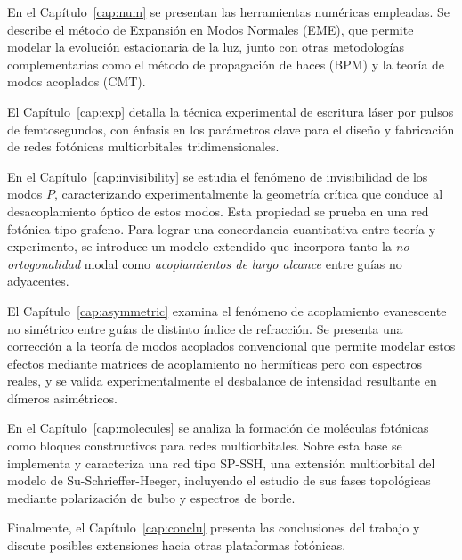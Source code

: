 En el Capítulo~\ref{cap:num} se presentan las herramientas numéricas empleadas. Se describe el método de Expansión en Modos Normales (EME), que permite modelar la evolución estacionaria de la luz, junto con otras metodologías complementarias como el método de propagación de haces (BPM) y la teoría de modos acoplados (CMT).

El Capítulo~\ref{cap:exp} detalla la técnica experimental de escritura láser por pulsos de femtosegundos, con énfasis en los parámetros clave para el diseño y fabricación de redes fotónicas multiorbitales tridimensionales.

En el Capítulo~\ref{cap:invisibility} se estudia el fenómeno de invisibilidad de los modos \( P \), caracterizando experimentalmente la geometría crítica que conduce al desacoplamiento óptico de estos modos. Esta propiedad se prueba en una red fotónica tipo grafeno. Para lograr una concordancia cuantitativa entre teoría y experimento, se introduce un modelo extendido que incorpora tanto la \textit{no ortogonalidad} modal como \textit{acoplamientos de largo alcance} entre guías no adyacentes.

El Capítulo~\ref{cap:asymmetric} examina el fenómeno de acoplamiento evanescente no simétrico entre guías de distinto índice de refracción. Se presenta una corrección a la teoría de modos acoplados convencional que permite modelar estos efectos mediante matrices de acoplamiento no hermíticas pero con espectros reales, y se valida experimentalmente el desbalance de intensidad resultante en dímeros asimétricos.

En el Capítulo~\ref{cap:molecules} se analiza la formación de moléculas fotónicas como bloques constructivos para redes multiorbitales. Sobre esta base se implementa y caracteriza una red tipo SP-SSH, una extensión multiorbital del modelo de Su-Schrieffer-Heeger, incluyendo el estudio de sus fases topológicas mediante polarización de bulto y espectros de borde.

Finalmente, el Capítulo~\ref{cap:conclu} presenta las conclusiones del trabajo y discute posibles extensiones hacia otras plataformas fotónicas.
